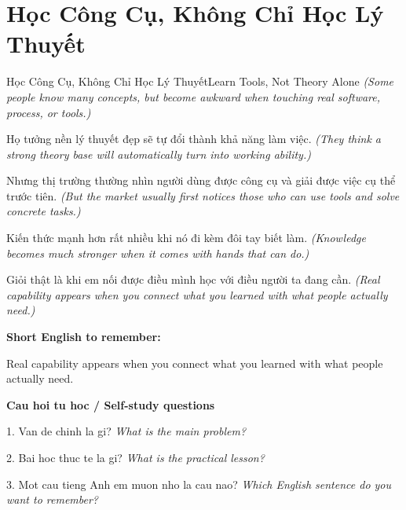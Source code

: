 \section{Học Công Cụ, Không Chỉ Học Lý Thuyết}
\begin{truyen}{Học Công Cụ, Không Chỉ Học Lý Thuyết}{Learn Tools, Not Theory Alone}
\textit{(Some people know many concepts, but become awkward when touching real software, process, or tools.)}

Họ tưởng nền lý thuyết đẹp sẽ tự đổi thành khả năng làm việc.
\textit{(They think a strong theory base will automatically turn into working ability.)}

Nhưng thị trường thường nhìn người dùng được công cụ và giải được việc cụ thể trước tiên.
\textit{(But the market usually first notices those who can use tools and solve concrete tasks.)}

Kiến thức mạnh hơn rất nhiều khi nó đi kèm đôi tay biết làm.
\textit{(Knowledge becomes much stronger when it comes with hands that can do.)}

\end{truyen}

\begin{baihoc}
Giỏi thật là khi em nối được điều mình học với điều người ta đang cần.
\textit{(Real capability appears when you connect what you learned with what people actually need.)}
\end{baihoc}

\begin{ghinhoanh}
\textbf{Short English to remember:}

Real capability appears when you connect what you learned with what people actually need.

\end{ghinhoanh}

\begin{tuhocnhanh}
\textbf{Cau hoi tu hoc / Self-study questions}

1. Van de chinh la gi? \textit{What is the main problem?}

2. Bai hoc thuc te la gi? \textit{What is the practical lesson?}

3. Mot cau tieng Anh em muon nho la cau nao? \textit{Which English sentence do you want to remember?}
\end{tuhocnhanh}
